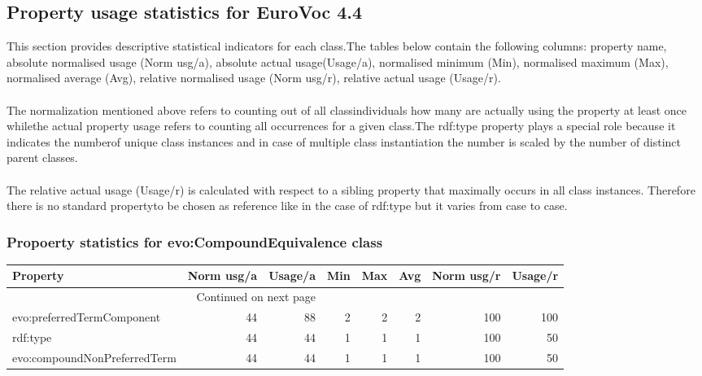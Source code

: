 \documentclass[10pt,a4paper,titlepage,final]{article}
\begin{document}
\subsection{Property usage statistics for EuroVoc 4.4}
This section provides descriptive statistical indicators for each class.The tables below contain the following columns: property name, absolute normalised usage (Norm usg/a), absolute actual usage(Usage/a), normalised minimum (Min), normalised maximum (Max), normalised average (Avg), relative normalised usage (Norm usg/r), relative actual usage (Usage/r).\\\\The normalization mentioned above refers to counting out of all classindividuals how many are actually using the property at least once whilethe actual property usage refers to counting all occurrences for a given class.The rdf:type property plays a special role because it indicates the numberof unique class instances and in case of multiple class instantiation the number is scaled by the  number of distinct parent classes. \\\\The relative actual usage (Usage/r) is calculated with respect to a sibling property that maximally occurs in all class instances. Therefore there is no standard propertyto be chosen as reference like in the case of rdf:type but it varies from case to case.
\subsubsection{Propoerty statistics for evo:CompoundEquivalence class}
\begin{longtable}{lrrrrrrr}
\toprule
                     Property &  Norm usg/a &  Usage/a &  Min &  Max &  Avg &  Norm usg/r &  Usage/r \\
\midrule
\endhead
\midrule
\multicolumn{3}{r}{{Continued on next page}} \\
\midrule
\endfoot

\bottomrule
\endlastfoot
   evo:preferredTermComponent &          44 &       88 &    2 &    2 &    2 &         100 &      100 \\
                     rdf:type &          44 &       44 &    1 &    1 &    1 &         100 &       50 \\
 evo:compoundNonPreferredTerm &          44 &       44 &    1 &    1 &    1 &         100 &       50 \\
\end{longtable}
\end{document}
